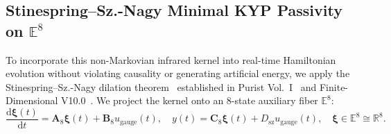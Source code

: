 \documentclass[11pt,a4paper,reqno]{article}
\theoremstyle{plain}
\theoremstyle{definition}
\theoremstyle{remark}
\numberwithin{equation}{section}
\providecommand{\diff}{\mathrm{d}}
\begin{document}
\subsection{Stinespring--Sz.-Nagy Minimal KYP Passivity on \texorpdfstring{$\mathbb{E}^8$}{E\textasciicircum 8}}
\label{subsec:stinespring_kyp_ym}

To incorporate this non-Markovian infrared kernel into real-time Hamiltonian evolution without violating causality or generating artificial energy, we apply the Stinespring--Sz.-Nagy dilation theorem~\cite{stinespring1955, sznagy1970} established in Purist Vol.~I~\cite{PuristVol1Monograph2026} and Finite-Dimensional V10.0~\cite{FiniteV10Monograph2026}. We project the kernel onto an 8-state auxiliary fiber $\mathbb{E}^8$:
\begin{equation}
  \frac{\diff \bm{\xi}(t)}{\diff t} = \mathbf{A}_8 \bm{\xi}(t) + \mathbf{B}_8 u_{\mathrm{gauge}}(t), \quad y(t) = \mathbf{C}_8 \bm{\xi}(t) + D_{\mathrm{sz}} u_{\mathrm{gauge}}(t), \quad \bm{\xi} \in \mathbb{E}^8 \cong \mathbb{R}^8.
  \label{eq:ym_state_space}
\end{equation}
\end{document}
